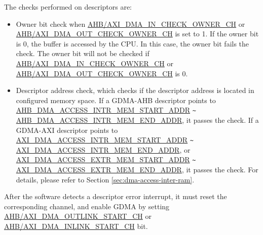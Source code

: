 \documentclass[main\_\_EN.tex]{subfiles}
\begin{document}
The checks performed on descriptors are:
\begin{itemize}
    \item Owner bit check when \hyperref[fielddesc:AHBDMAINCHECKOWNERCHN]{AHB/AXI\_DMA\_IN\_CHECK\_OWNER\_CH} or \hyperref[fielddesc:AHBDMAOUTCHECKOWNERCHN]{AHB/AXI\_DMA\_OUT\_CHECK\_OWNER\_CH} is set to 1. If the owner bit is 0, the buffer is accessed by the CPU. In this case, the owner bit fails the check. The owner bit will not be checked if \hyperref[fielddesc:AHBDMAINCHECKOWNERCHN]{AHB/AXI\_DMA\_IN\_CHECK\_OWNER\_CH} or \hyperref[fielddesc:AHBDMAOUTCHECKOWNERCHN]{AHB/AXI\_DMA\_OUT\_CHECK\_OWNER\_CH} is 0.
    \item Descriptor address check, which checks if the descriptor address is located in configured memory space. If a GDMA-AHB descriptor points to \hyperref[fielddesc:AHBDMAACCESSINTRMEMSTARTADDR]{AHB\_DMA\_ACCESS\_INTR\_MEM\_START\_ADDR} \verb+~+ \hyperref[fielddesc:AHBDMAACCESSINTRMEMENDADDR]{AHB\_DMA\_ACCESS\_INTR\_MEM\_END\_ADDR}, it passes the check. If a GDMA-AXI descriptor points to \hyperref[fielddesc:AXIDMAACCESSINTRMEMSTARTADDR]{AXI\_DMA\_ACCESS\_INTR\_MEM\_START\_ADDR} \verb+~+ \hyperref[fielddesc:AXIDMAACCESSINTRMEMENDADDR]{AXI\_DMA\_ACCESS\_INTR\_MEM\_END\_ADDR}, or \hyperref[fielddesc:AXIDMAACCESSEXTRMEMSTARTADDR]{AXI\_DMA\_ACCESS\_EXTR\_MEM\_START\_ADDR} \verb+~+ \hyperref[fielddesc:AXIDMAACCESSEXTRMEMENDADDR]{AXI\_DMA\_ACCESS\_EXTR\_MEM\_END\_ADDR}, it passes the check. For details, please refer to Section \ref{sec:dma-access-inter-ram}.
\end{itemize}

After the software detects a descriptor error interrupt, it must reset the corresponding channel, and enable GDMA by setting \hyperref[fielddesc:AHBDMAOUTLINKSTARTCHN]{AHB/AXI\_DMA\_OUTLINK\_START\_CH} or \hyperref[fielddesc:AHBDMAINLINKSTARTCHN]{AHB/AXI\_DMA\_INLINK\_START\_CH} bit.

\end{document}
